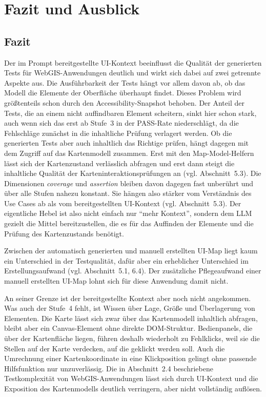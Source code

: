 \newpage
\section{Fazit und Ausblick}

\subsection{Fazit}

Der im Prompt bereitgestellte \ac{UI}-Kontext beeinflusst die Qualität der generierten Tests für WebGIS-Anwendungen deutlich und wirkt sich dabei auf zwei getrennte Aspekte aus. Die Ausführbarkeit der Tests hängt vor allem davon ab, ob das Modell die Elemente der Oberfläche überhaupt findet. Dieses Problem wird größtenteils schon durch den Accessibility-Snapshot behoben. Der Anteil der Tests, die an einem nicht auffindbaren Element scheitern, sinkt hier schon stark, auch wenn sich das erst ab Stufe~3 in der PASS-Rate niederschlägt, da die Fehlschläge zunächst in die inhaltliche Prüfung verlagert werden. Ob die generierten Tests aber auch inhaltlich das Richtige prüfen, hängt dagegen mit dem Zugriff auf das Kartenmodell zusammen. Erst mit den Map-Model-Helfern lässt sich der Kartenzustand verlässlich abfragen und erst dann steigt die inhaltliche Qualität der Karteninteraktionsprüfungen an (vgl. Abschnitt~5.3). Die Dimensionen \emph{coverage} und \emph{assertion} bleiben davon dagegen fast unberührt und über alle Stufen nahezu konstant. Sie hängen also stärker vom Verständnis des Use Cases ab als vom bereitgestellten \ac{UI}-Kontext (vgl. Abschnitt~5.3). Der eigentliche Hebel ist also nicht einfach nur \enquote{mehr Kontext}, sondern dem \ac{LLM} gezielt die Mittel bereitzustellen, die es für das Auffinden der Elemente und die Prüfung des Kartenzustands benötigt.

Zwischen der automatisch generierten und manuell erstellten \ac{UI}-Map liegt kaum ein Unterschied in der Testqualität, dafür aber ein erheblicher Unterschied im Erstellungsaufwand (vgl. Abschnitt~5.1, 6.4). Der zusätzliche Pflegeaufwand einer manuell erstellten \ac{UI}-Map lohnt sich für diese Anwendung damit nicht.

An seiner Grenze ist der bereitgestellte Kontext aber noch nicht angekommen. Was auch der Stufe~4 fehlt, ist Wissen über Lage, Größe und Überlagerung von Elementen. Die Karte lässt sich zwar über das Kartenmodell inhaltlich abfragen, bleibt aber ein Canvas-Element ohne direkte \ac{DOM}-Struktur. Bedienpanels, die über der Kartenfläche liegen, führen deshalb wiederholt zu Fehlklicks, weil sie die Stellen auf der Karte verdecken, auf die geklickt werden soll. Auch die Umrechnung einer Kartenkoordinate in eine Klickposition gelingt ohne passende Hilfsfunktion nur unzuverlässig. Die in Abschnitt~2.4 beschriebene Testkomplexität von WebGIS-Anwendungen lässt sich durch \ac{UI}-Kontext und die Exposition des Kartenmodells deutlich verringern, aber nicht vollständig auflösen.

